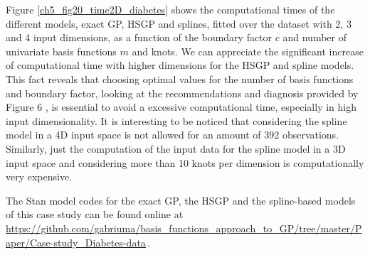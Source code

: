 \documentclass[onecolumn,a4paper,11pt]{article}
\begin{document}
Figure \ref{ch5_fig20_time2D_diabetes} shows the computational times of the different models, exact GP, HSGP and splines, fitted over the dataset with 2, 3 and 4 input dimensions, as a function of the boundary factor $c$ and number of univariate basis functions $m$ and knots. We can appreciate the significant increase
of computational time with higher dimensions for the HSGP and spline models.
This fact reveals that choosing optimal values for the number of basis functions and
boundary factor, looking at the recommendations and diagnosis provided by Figure 6%
, is essential to avoid a excessive computational time, especially in high input
dimensionality. It is interesting to be noticed that considering the spline model in a 4D input space is not allowed for an amount of 392
observations. Similarly, just the computation of the input data for the spline model
in a 3D input space and considering more than 10 knots per dimension is computationally very expensive.

The Stan model codes for the exact GP, the HSGP and the spline-based models of this case study can be found online at {\small \url{https://github.com/gabriuma/basis_functions_approach_to_GP/tree/master/Paper/Case-study_Diabetes-data}}\,.
\end{document}
